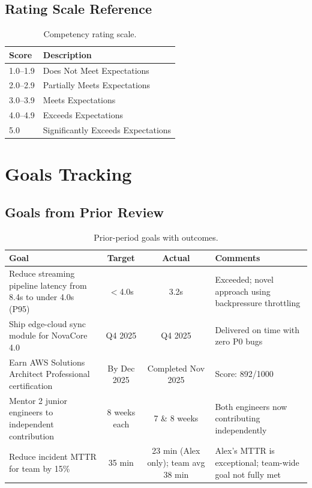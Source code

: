 \documentclass[
    language=english,
    doctype=performance-review,
    institution=none,
]{../../omnilatex}
\begin{document}
\subsection{Rating Scale Reference}

\begin{table}[h]
    \centering
    \begin{tabular}{ll}
        \toprule
        \textbf{Score} & \textbf{Description} \\
        \midrule
        1.0--1.9 & Does Not Meet Expectations \\
        2.0--2.9 & Partially Meets Expectations \\
        3.0--3.9 & Meets Expectations \\
        4.0--4.9 & Exceeds Expectations \\
        5.0      & Significantly Exceeds Expectations \\
        \bottomrule
    \end{tabular}
    \caption{Competency rating scale.}
\end{table}

\section{Goals Tracking}

\subsection{Goals from Prior Review}

\begin{table}[h]
    \centering
    \begin{tabular}{p{5cm}ccp{4cm}}
        \toprule
        \textbf{Goal} & \textbf{Target} & \textbf{Actual} & \textbf{Comments} \\
        \midrule
        Reduce streaming pipeline latency from 8.4s to under 4.0s (P95) &
            $<$4.0s & 3.2s & Exceeded; novel approach using backpressure
            throttling \\
        Ship edge-cloud sync module for NovaCore 4.0 &
            Q4 2025 & Q4 2025 & Delivered on time with zero P0 bugs \\
        Earn AWS Solutions Architect Professional certification &
            By Dec 2025 & Completed Nov 2025 & Score: 892/1000 \\
        Mentor 2 junior engineers to independent contribution &
            8 weeks each & 7 \& 8 weeks & Both engineers now contributing
            independently \\
        Reduce incident MTTR for team by 15\% &
            35 min & 23 min (Alex only); team avg 38 min & Alex's MTTR
            is exceptional; team-wide goal not fully met \\
        \bottomrule
    \end{tabular}
    \caption{Prior-period goals with outcomes.}
\end{table}
\end{document}
